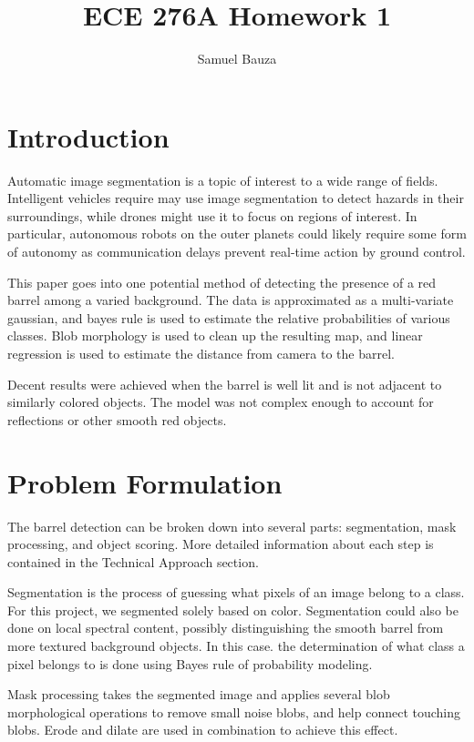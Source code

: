 \documentclass[a4paper]{article}
\title{ECE 276A Homework 1}
\author{Samuel Bauza}
\begin{document}
\maketitle

\section{Introduction}

	Automatic image segmentation is a topic of interest to a wide range of fields. Intelligent vehicles require may use image segmentation to detect hazards in their surroundings, while drones might use it to focus on regions of interest. In particular, autonomous robots on the outer planets could likely require some form of autonomy as communication delays prevent real-time action by ground control.
    
	This paper goes into one potential method of detecting the presence of a red barrel among a varied background. The data is approximated as a multi-variate gaussian, and bayes rule is used to estimate the relative probabilities of various classes. Blob morphology is used to clean up the resulting map, and linear regression is used to estimate the distance from camera to the barrel.
    
	Decent results were achieved when the barrel is well lit and is not adjacent to similarly colored objects. The model was not complex enough to account for reflections or other smooth red objects.


\section{Problem Formulation}

	The barrel detection can be broken down into several parts: segmentation, mask processing, and object scoring. More detailed information about each step is contained in the Technical Approach section.
    
	Segmentation is the process of guessing what pixels of an image belong to a class. For this project, we segmented solely based on color. Segmentation could also be done on local spectral content, possibly distinguishing the smooth barrel from more textured background objects. In this case. the determination of what class a pixel belongs to is done using Bayes rule of probability modeling.
    
	Mask processing takes the segmented image and applies several blob morphological operations to remove small noise blobs, and help connect touching blobs. Erode and dilate are used in combination to achieve this effect.
    
\end{document}
